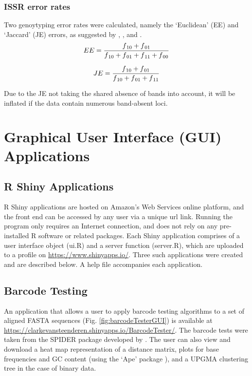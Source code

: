 \subsubsection{ISSR error rates}

Two genoytyping error rates were calculated, namely the `Euclidean' (EE) and `Jaccard' (JE) errors, as suggested by \citet{bonin2004track}, \citet{pompanon2005genotyping}, and \citet{holland2008optimizing}. \newline 
\[EE = \frac{f\textsubscript{10} + f\textsubscript{01}}{f\textsubscript{10} + f\textsubscript{01} + f\textsubscript{11} + f\textsubscript{00}} \] 
 
\[JE = \frac{f\textsubscript{10} + f\textsubscript{01}}{f\textsubscript{10} + f\textsubscript{01} + f\textsubscript{11}} \]
 
\noindent Due to the JE not taking the shared absence of bands into account, it will be inflated if the data contain numerous band-absent loci.

\section{Graphical User Interface (GUI) Applications}

\subsection{R Shiny Applications}
R Shiny applications \citep{shiny} are hosted on Amazon's Web Services online platform, and the front end can be accessed by any user via a unique url link. Running the program only requires an Internet connection, and does not rely on any pre-installed R software or related packages. Each Shiny application comprises of a user interface object (ui.R) and a server function (server.R), which are uploaded to a profile on \url{https://www.shinyapps.io/}. Three such applications were created and are described below. A help file accompanies each application. 

\subsection{Barcode Testing}
An application that allows a user to apply barcode testing algorithms to a set of aligned FASTA sequences (Fig. \ref{fig:barcodeTesterGUI}) is available at \url{https://clarkevansteenderen.shinyapps.io/BarcodeTester/}. The barcode tests were taken from the SPIDER package developed by \citet{Brown2012Spider:Barcoding}. The user can also view and download a heat map representation of a distance matrix, plots for base frequencies and GC content (using the `Ape' package \citep{Paradis2004APE:Language}), and a UPGMA clustering tree in the case of binary data.  

